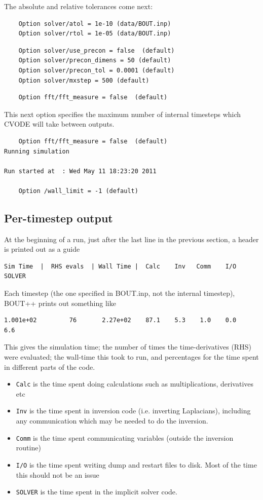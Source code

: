 \documentclass[12pt]{article}
\newcommand{\code}[1]{\texttt{#1}}
\begin{document}
The absolute and relative tolerances come next:
\begin{verbatim}
	Option solver/atol = 1e-10 (data/BOUT.inp)
	Option solver/rtol = 1e-05 (data/BOUT.inp)
\end{verbatim}

\begin{verbatim}
	Option solver/use_precon = false  (default)
	Option solver/precon_dimens = 50 (default)
	Option solver/precon_tol = 0.0001 (default)
	Option solver/mxstep = 500 (default)
\end{verbatim}


\begin{verbatim}
	Option fft/fft_measure = false  (default)
\end{verbatim}
This next option specifies the maximum number of internal timesteps which CVODE
will take between outputs.
\begin{verbatim}
	Option fft/fft_measure = false  (default)
Running simulation

Run started at  : Wed May 11 18:23:20 2011

	Option /wall_limit = -1 (default)
\end{verbatim}

\subsection{Per-timestep output}

At the beginning of a run, just after the last line in the previous section,
a header is printed out as a guide
\begin{verbatim}
Sim Time  |  RHS evals  | Wall Time |  Calc    Inv   Comm    I/O   SOLVER
\end{verbatim}

Each timestep (the one specified in BOUT.inp, not the internal timestep), 
BOUT++ prints out something like
\begin{verbatim}
1.001e+02         76       2.27e+02    87.1    5.3    1.0    0.0    6.6
\end{verbatim}

This gives the simulation time; the number of times the time-derivatives (RHS) were evaluated;
the wall-time this took to run, and percentages for the time spent in different parts of the code. 
\begin{itemize}
\item \code{Calc} is the time spent doing calculations such as multiplications, derivatives etc
\item \code{Inv} is the time spent in inversion code (i.e. inverting Laplacians), including any communication
which may be needed to do the inversion.
\item \code{Comm} is the time spent communicating variables (outside the inversion routine)
\item \code{I/O} is the time spent writing dump and restart files to disk. Most of the time this should not be an issue
\item \code{SOLVER} is the time spent in the implicit solver code.
\end{itemize}
\end{document}
